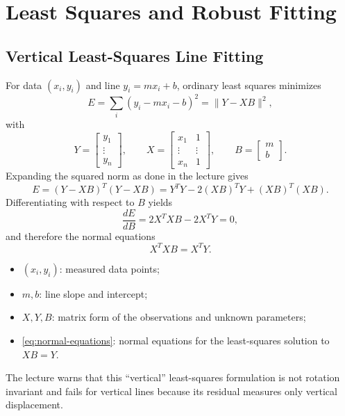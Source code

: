 \documentclass[11pt,a4paper,oneside]{report}
\newcommand{\mathlegend}[1]{%
  \par\vspace{0.2em}{\small\itshape where}\par
  \begin{itemize}[leftmargin=1.7em,topsep=0.15em,itemsep=0.12em]
  #1
  \end{itemize}
}
\begin{document}
\chapter{Least Squares and Robust Fitting}

\section{Vertical Least-Squares Line Fitting}

For data $(x_i,y_i)$ and line $y_i=mx_i+b$, ordinary least squares minimizes
\begin{equation}
  E=\sum_i(y_i-mx_i-b)^2=\lVert Y-XB\rVert^2,
  \label{eq:vertical-ls}
\end{equation}
with
\[
Y=\begin{bmatrix}y_1\\\vdots\\y_n\end{bmatrix},\qquad
X=\begin{bmatrix}x_1&1\\\vdots&\vdots\\x_n&1\end{bmatrix},\qquad
B=\begin{bmatrix}m\\b\end{bmatrix}.
\]
Expanding the squared norm as done in the lecture gives
\begin{equation}
  E=(Y-XB)^T(Y-XB)
   =Y^TY-2(XB)^TY+(XB)^T(XB).
  \label{eq:ls-expanded}
\end{equation}
Differentiating with respect to $B$ yields
\begin{equation}
  \frac{dE}{dB}=2X^TXB-2X^TY=0,
  \label{eq:ls-gradient}
\end{equation}
and therefore the normal equations
\begin{equation}
  X^TXB=X^TY.
  \label{eq:normal-equations}
\end{equation}
\mathlegend{
  \item $(x_i,y_i)$: measured data points;
  \item $m,b$: line slope and intercept;
  \item $X,Y,B$: matrix form of the observations and unknown parameters;
  \item \cref{eq:normal-equations}: normal equations for the least-squares solution to $XB=Y$.
}

The lecture warns that this ``vertical'' least-squares formulation is not rotation invariant and fails for vertical lines because its residual measures only vertical displacement.
\end{document}

